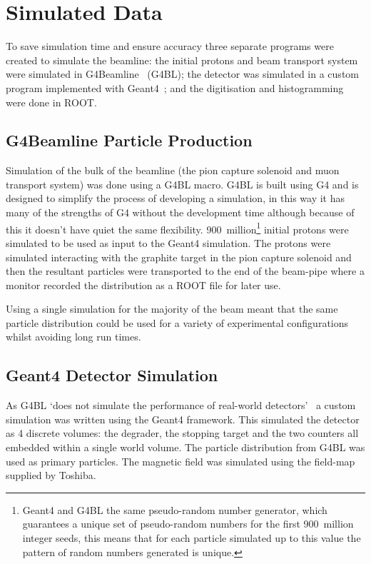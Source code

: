 \documentclass[]{article}
\begin{document}
\section{Simulated Data} %
\label{sec:simulated_data}
To save simulation time and ensure accuracy three separate programs were created to simulate the beamline: the initial protons and beam transport system were simulated in G4Beamline~\cite{G4BL} (G4BL); the detector was simulated in a custom program implemented with Geant4~\cite{Agostinelli2003250}; and the digitisation and histogramming were done in ROOT.

\subsection{G4Beamline Particle Production} %
\label{sub:g4bl_particle_production}
Simulation of the bulk of the beamline (the pion capture solenoid and muon transport system) was done using a G4BL macro. G4BL is built using G4 and is designed to simplify the process of developing a simulation, in this way it has many of the strengths of G4 without the development time although because of this it doesn't have quiet the same flexibility. 900~million\footnote{ Geant4 and G4BL the same pseudo-random number generator, which guarantees a unique set of pseudo-random numbers for the first 900~million integer seeds, this means that for each particle simulated up to this value the pattern of random numbers generated is unique.} initial protons were simulated to be used as input to the Geant4 simulation. The protons were simulated interacting with the graphite target in the pion capture solenoid and then the resultant particles were transported to the end of the beam-pipe where a monitor recorded the distribution as a ROOT file for later use. 

Using a single simulation for the majority of the beam meant that the same particle distribution could be used for a variety of experimental configurations whilst avoiding long run times.

\subsection{Geant4 Detector Simulation} %
\label{sub:geant4_detector_simulation}
As G4BL `does not simulate the performance of real-world detectors'~\cite{G4BL} a custom simulation was written using the Geant4 framework. This simulated the detector as 4 discrete volumes: the degrader, the stopping target and the two counters all embedded within a single world volume. The particle distribution from G4BL was used as primary particles. The magnetic field was simulated using the field-map supplied by Toshiba.
\end{document}
